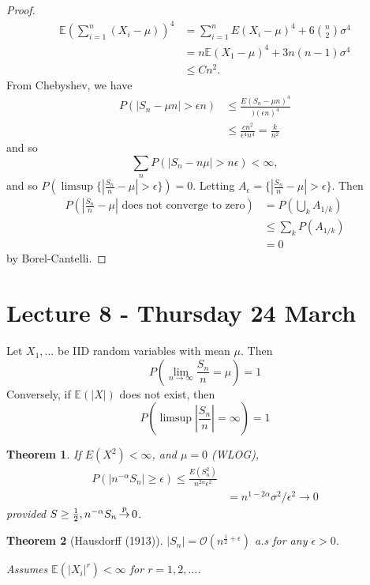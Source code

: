 \documentclass[10pt, oneside, reqno]{amsart}
\theoremstyle{plain}%
\newtheorem{thm}{Theorem}[section]
\theoremstyle{definition}
\theoremstyle{remark}
\newcommand{\E}{\mathbb{E}}
\def\cip{\,{\buildrel p \over \rightarrow}\,}
\begin{document}
\begin{proof}
    \begin{align*}
        \E(\sum_{i=1}^n (X_i - \mu))^4 &= \sum_{i=1}^n E(X_i - \mu)^4 + 6 {n \choose 2} \sigma^4 \\
        &= n \E(X_1 - \mu)^4 + 3n(n-1) \sigma^4 \\
        &\leq Cn^2. 
    \end{align*}
    From Chebyshev, we have 
    \begin{align*}
        P(| S_n - \mu n| > \epsilon n) &\leq \frac{E(S_n - \mu n)^4}{)(\epsilon n)^4} \\
                &\leq \frac{cn^2}{\epsilon^4 n^4} = \frac{k}{n^2} 
    \end{align*}
    and so \[
        \sum_n P(|S_n - n \mu| > n \epsilon) < \infty,  \]
    and so $P(\limsup \{ | \frac{S_n}{n} - \mu | > \epsilon \} ) = 0$.  Letting $A_\epsilon = \{ | \frac{S_n}{n} - \mu | > \epsilon \}$.  Then 
    \begin{align*}
        P(|\frac{S_n}{n} - \mu | \text{ does not converge to zero}) &= P(\bigcup_k A_{1/k}) \\
        &\leq \sum_{k} P(A_{1/k}) \\
        &= 0
    \end{align*} by Borel-Cantelli.
\end{proof}

\section{Lecture 8 - Thursday 24 March} %
\label{sec:lecture_8_thursday_24_march}
    Let $X_1, \dots$ be IID random variables with mean $\mu$.  Then \[
        P(\lim_{n \rightarrow \infty} \frac{S_n}{n} = \mu) = 1
    \]
    Conversely, if $\E(|X|)$ does not exist, then \[
        P( \limsup |\frac{S_n}{n}| = \infty) = 1
    \]

\begin{thm}
    If $E(X^2) < \infty$, and $\mu = 0$ (WLOG), 
    \begin{align*}
        P( |n^{-\alpha} S_n | \geq \epsilon) \leq \frac{E(S_n^2)}{n^{2 \alpha} \epsilon^2} \\
        &=n ^{1-2\alpha} \sigma^2/\epsilon^2 \rightarrow 0
    \end{align*} provided $S \geq \frac{1}{2}, n^{-\alpha} S_n \cip 0$.  
\end{thm}

\begin{thm}[Hausdorff (1913)]   $|S_n | = \mathcal{O}(n^{\frac{1}{2} + \epsilon})$ a.s for any $\epsilon > 0$.
    
    Assumes $\E(|X_i|^r) < \infty$ for $r = 1, 2, \dots$. 
\end{thm}
\end{document}
